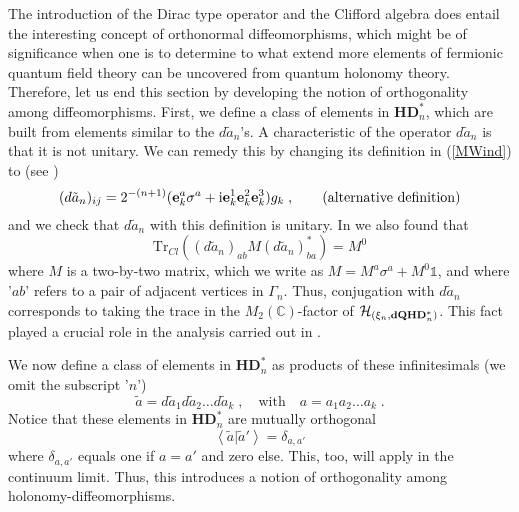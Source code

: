 \documentclass[12pt]{article}
\def\d{\delta}
\def\G{\Gamma}
\def\ch{{\cal H}}
\begin{document}
The introduction of the Dirac type operator and the Clifford algebra does entail the interesting concept of orthonormal diffeomorphisms, which might be of significance when one is to determine to what extend more elements of fermionic quantum field theory can be uncovered from quantum holonomy theory.
%
Therefore, let us end this section by developing the notion of orthogonality among diffeomorphisms. First, we define a class of elements in $\mathbf{HD}^*_n$, which are built from elements similar to the $d\tilde{a}_n$'s. A characteristic of the operator $d\tilde{a}_n$ is that it is not unitary. We can remedy this by changing its definition in (\ref{MWind}) to (see \cite{Aastrup:2011dt})
$$
(d\tilde{a}_n)_{ij}  =  2^{-(n+1)}({\bf e}^a_k  \sigma^a + \mathrm{i} {\bf e}^1_k{\bf e}^2_k{\bf e}^3_k ) g_k\;,    \qquad \mbox{(alternative definition)}
$$
and we check that $d\tilde{a}_n$ with this definition is unitary. In \cite{Aastrup:2011dt} we also found that
$$
\mbox{Tr}_{Cl} (  (d\tilde{a}_n)_{ab}  M (d\tilde{a}_n)^*_{ba}        ) = M^0 
$$
where $M$ is a two-by-two matrix, which we write as $M=M^a \sigma^a + M^0 \mathds{1}$, and where '$ab$' refers to a pair of adjacent vertices in $\G_n$. Thus, conjugation with $d\tilde{a}_n$ corresponds to taking the trace in the $M_2(\mathbb{C})$-factor of $\ch_{(\xi_n,\mathbf{dQHD}^*_n)}$. This fact played a crucial role in the analysis carried out in \cite{Aastrup:2011dt}.

We now define a class of elements in $\mathbf{HD}^*_n$ as products of these infinitesimals (we omit the subscript '$n$')
$$
\tilde a = d\tilde{a}_1 d\tilde{a}_2\ldots d\tilde{a}_k\;, \quad \mbox{with}\quad a = a_1 a_2\ldots a_k\;.
$$
Notice that these elements in $\mathbf{HD}^*_n$ are mutually orthogonal
$$
\left\langle \tilde{a}\vert \tilde{a}' \right\rangle =\d_{a,a'}
$$
where $\d_{a,a'}$ equals one if $a=a'$ and zero else. This, too, will apply in the continuum limit. Thus, this introduces a notion of orthogonality among holonomy-diffeomorphisms. 


\end{document}
